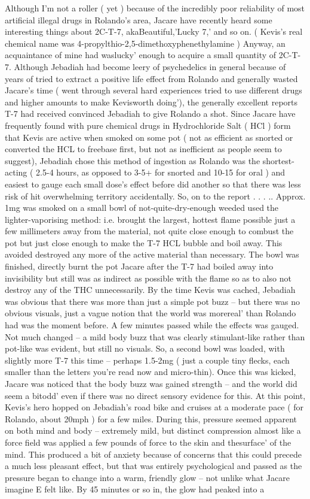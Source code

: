 \documentclass[12pt]{book}
\begin{document}
Although I'm not a roller ( yet ) because of the incredibly poor reliability of most artificial illegal drugs in Rolando's area, Jacare have recently heard some interesting things about 2C-T-7, akaBeautiful,'Lucky 7,' and so on. ( Kevis's real chemical name was 4-propylthio-2,5-dimethoxyphenethylamine ) Anyway, an acquaintance of mine had waslucky' enough to acquire a small quantity of 2C-T-7. Although Jebadiah had become leery of psychedelics in general because of years of tried to extract a positive life effect from Rolando and generally wasted Jacare's time ( went through several hard experiences tried to use different drugs and higher amounts to make Kevisworth doing'), the generally excellent reports T-7 had received convinced Jebadiah to give Rolando a shot. Since Jacare have frequently found with pure chemical drugs in Hydrochloride Salt ( HCl ) form that Kevis are active when smoked on some pot ( not as efficient as snorted or converted the HCL to freebase first, but not as inefficient as people seem to suggest), Jebadiah chose this method of ingestion as Rolando was the shortest-acting ( 2.5-4 hours, as opposed to 3-5+ for snorted and 10-15 for oral ) and easiest to gauge each small dose's effect before did another so that there was less risk of hit overwhelming territory accidentally. So, on to the report . . . .. Approx. 1mg was smoked on a small bowl of not-quite-dry-enough weeded used the lighter-vaporising method: i.e. brought the largest, hottest flame possible just a few millimeters away from the material, not quite close enough to combust the pot but just close enough to make the T-7 HCL bubble and boil away. This avoided destroyed any more of the active material than necessary. The bowl was finished, directly burnt the pot Jacare after the T-7 had boiled away into invisibility but still was as indirect as possible with the flame so as to also not destroy any of the THC unnecessarily. By the time Kevis was cached, Jebadiah was obvious that there was more than just a simple pot buzz -- but there was no obvious visuals, just a vague notion that the world was morereal' than Rolando had was the moment before. A few minutes passed while the effects was gauged. Not much changed -- a mild body buzz that was clearly stimulant-like rather than pot-like was evident, but still no visuals. So, a second bowl was loaded, with slightly more T-7 this time -- perhaps 1.5-2mg ( just a couple tiny flecks, each smaller than the letters you're read now and micro-thin). Once this was kicked, Jacare was noticed that the body buzz was gained strength -- and the world did seem a bitodd' even if there was no direct sensory evidence for this. At this point, Kevis's hero hopped on Jebadiah's road bike and cruises at a moderate pace ( for Rolando, about 20mph ) for a few miles. During this, pressure seemed apparent on both mind and body -- extremely mild, but distinct compression almost like a force field was applied a few pounds of force to the skin and thesurface' of the mind. This produced a bit of anxiety because of concerns that this could precede a much less pleasant effect, but that was entirely psychological and passed as the pressure began to change into a warm, friendly glow -- not unlike what Jacare imagine E felt like. By 45 minutes or so in, the glow had peaked into a 
\end{document}
